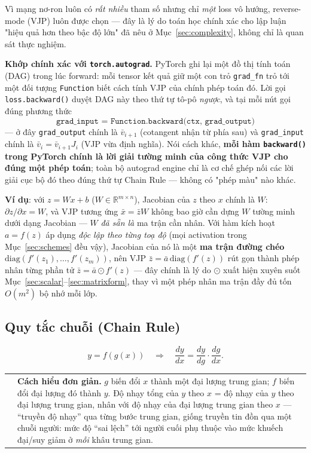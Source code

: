 \documentclass[12pt,a4paper]{report}
\makeatletter
\newenvironment{tructiep}[1][Cách hiểu đơn giản]
  {\par\smallskip\noindent\begin{tabular}{@{}p{0.35em}@{\hspace{6pt}}p{\dimexpr\linewidth-1.9em\relax}@{}}
   \textcolor{boxln}{\rule{2pt}{\baselineskip}} & \textbf{#1.}\enspace\ignorespaces}
  {\end{tabular}\par\smallskip}
\makeatother
\begin{document}
Vì mạng nơ-ron luôn có \emph{rất nhiều} tham số nhưng chỉ \emph{một} loss
vô hướng, reverse-mode (VJP) luôn được chọn --- đây là lý do toán học
chính xác cho lập luận "hiệu quả hơn theo bậc độ lớn" đã nêu ở
Mục~\ref{sec:complexity}, không chỉ là quan sát thực nghiệm.

\textbf{Khớp chính xác với \texttt{torch.autograd}.} PyTorch ghi lại một
đồ thị tính toán (DAG) trong lúc forward: mỗi tensor kết quả giữ một con
trỏ \texttt{grad\_fn} trỏ tới một đối tượng \texttt{Function} biết cách
tính VJP của chính phép toán đó. Lời gọi \texttt{loss.backward()} duyệt
DAG này theo thứ tự tô-pô \emph{ngược}, và tại mỗi nút gọi đúng phương
thức
$$\texttt{grad\_input = Function.backward(ctx, grad\_output)}$$
--- ở đây \texttt{grad\_output} chính là $\bar v_{i+1}$ (cotangent nhận từ
phía sau) và \texttt{grad\_input} chính là $\bar v_i=\bar v_{i+1}J_i$ (VJP
vừa định nghĩa). Nói cách khác, \textbf{mỗi hàm \texttt{backward()} trong
PyTorch chính là lời giải tường minh của công thức VJP cho đúng một phép
toán}; toàn bộ autograd engine chỉ là cơ chế ghép nối các lời giải cục bộ
đó theo đúng thứ tự Chain Rule --- không có "phép màu" nào khác.

\textbf{Ví dụ}: với $z=Wx+b$ ($W\in\mathbb R^{m\times n}$), Jacobian của
$z$ theo $x$ chính là $W$: $\partial z/\partial x = W$, và VJP tương ứng
$\bar x=\bar zW$ không bao giờ cần dựng $W$ tường minh dưới dạng Jacobian
--- $W$ \emph{đã sẵn là} ma trận cần nhân. Với hàm kích hoạt $a=f(z)$ áp
dụng \emph{độc lập theo từng toạ độ} (mọi activation trong
Mục~\ref{sec:schemes} đều vậy), Jacobian của nó là một \textbf{ma trận
đường chéo} $\mathrm{diag}(f'(z_1),\ldots,f'(z_m))$, nên VJP
$\bar z=\bar a\,\mathrm{diag}(f'(z))$ rút gọn thành phép nhân từng phần tử
$\bar z=\bar a\odot f'(z)$ --- đây chính là lý do $\odot$ xuất hiện xuyên
suốt Mục~\ref{sec:scalar}--\ref{sec:matrixform}, thay vì một phép nhân ma
trận đầy đủ tốn $O(m^2)$ bộ nhớ mỗi lớp.

\subsection{Quy tắc chuỗi (Chain Rule)}
\label{sec:chainrule}

$$y = f(g(x)) \quad\Longrightarrow\quad \frac{dy}{dx} = \frac{dy}{dg}\cdot\frac{dg}{dx}.$$

\begin{tructiep}
$g$ biến đổi $x$ thành một đại lượng trung gian; $f$ biến đổi đại lượng đó
thành $y$. Độ nhạy tổng của $y$ theo $x$ = độ nhạy của $y$ theo đại lượng
trung gian, nhân với độ nhạy của đại lượng trung gian theo $x$ --- ``truyền
độ nhạy'' qua từng bước trung gian, giống truyền tin đồn qua một chuỗi
người: mức độ ``sai lệch'' tới người cuối phụ thuộc vào mức khuếch đại/suy
giảm ở \emph{mỗi} khâu trung gian.
\end{tructiep}
\end{document}
